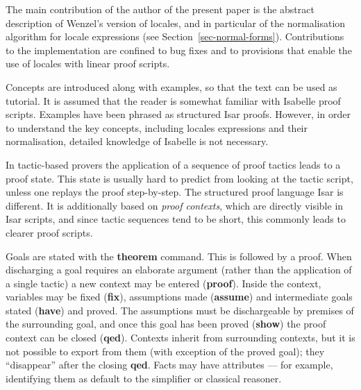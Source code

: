 \begin{isabellebody}
\begin{isamarkuptext}
  The main contribution of the author of the present paper is the
  abstract description of Wenzel's version of locales, and in
  particular of the normalisation algorithm for locale expressions (see
  Section~\ref{sec-normal-forms}).  Contributions to the
  implementation are confined to bug fixes and to provisions that
  enable the use of locales with linear proof scripts.

  Concepts are introduced along with examples, so that the text can be
  used as tutorial.  It is assumed that the reader is somewhat
  familiar with Isabelle proof scripts.  Examples have been phrased as
  structured
  Isar proofs.  However, in order to understand the key concepts,
  including locales expressions and their normalisation, detailed
  knowledge of Isabelle is not necessary. 

\nocite{Nipkow2003,Wenzel2002b,Wenzel2003}%
\end{isamarkuptext}%
\isamarkuptrue%
%
\isamarkuptrue%
%
\begin{isamarkuptext}%
In tactic-based provers the application of a sequence of proof
  tactics leads to a proof state.  This state is usually hard to
  predict from looking at the tactic script, unless one replays the
  proof step-by-step.  The structured proof language Isar is
  different.  It is additionally based on \emph{proof contexts},
  which are directly visible in Isar scripts, and since tactic
  sequences tend to be short, this commonly leads to clearer proof
  scripts.

  Goals are stated with the \textbf{theorem}
  command.  This is followed by a proof.  When discharging a goal
  requires an elaborate argument
  (rather than the application of a single tactic) a new context
  may be entered (\textbf{proof}).  Inside the context, variables may
  be fixed (\textbf{fix}), assumptions made (\textbf{assume}) and
  intermediate goals stated (\textbf{have}) and proved.  The
  assumptions must be dischargeable by premises of the surrounding
  goal, and once this goal has been proved (\textbf{show}) the proof context
  can be closed (\textbf{qed}). Contexts inherit from surrounding
  contexts, but it is not possible
  to export from them (with exception of the proved goal);
  they ``disappear'' after the closing \textbf{qed}.
  Facts may have attributes --- for example, identifying them as
  default to the simplifier or classical reasoner.


\end{isamarkuptext}
\end{isabellebody}
